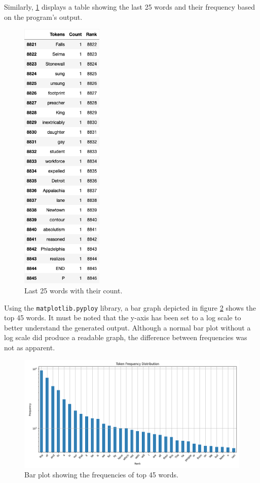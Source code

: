 \documentclass[titlepage]{article}
\begin{document}
Similarly, \ref{fig:FigLast25} displays a table showing the last 25 words and their frequency based
on the program's output.

\begin{figure}[H]
    \centering
    \includegraphics[width=0.35\textwidth]{figures/df_last25.png}
    \caption{Last 25 words with their count.}
    \label{fig:FigLast25}
\end{figure}

Using the \texttt{matplotlib.pyploy} library, a bar graph depicted in figure \ref{fig:FigBar} shows 
the top 45 words. It must be noted that the y-axis has been set to a log scale to better understand
the generated output. Although a normal bar plot without a log scale did produce a readable graph,
the difference between frequencies was not as apparent.

\begin{figure}[H]
    \includegraphics[width=\textwidth]{figures/bar_plot.png}
    \caption{Bar plot showing the frequencies of top 45 words.}
    \label{fig:FigBar}
\end{figure}
\end{document}
